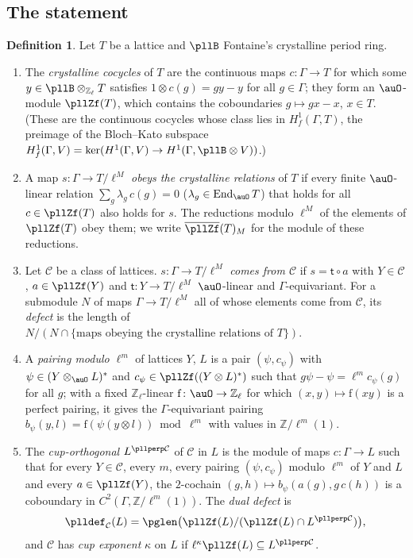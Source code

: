 \documentclass[10pt]{amsart}
\theoremstyle{definition}
\newtheorem{definition}[theorem]{Definition}
\theoremstyle{remark}
\newcommand{\Z}{\mathbb Z}
\begin{document}
\subsection{The statement}\label{pll:ss-statement}

\begin{definition}\label{pll:def}
Let $T$ be a lattice and $\pllB$ Fontaine's crystalline period ring.
\begin{enumerate}
\item The \emph{crystalline cocycles} of $T$ are the continuous maps $c\colon\Gamma\to T$ for which some
$y\in\pllB\otimes_{\Z_\ell}T$ satisfies $1\otimes c(g)=gy-y$ for all $g\in\Gamma$; they form an
$\auO$-module $\pllZf(T)$, which contains the coboundaries $g\mapsto gx-x$, $x\in T$. (These are
the continuous cocycles whose class lies in $H^1_f(\Gamma,T)$, the preimage of the Bloch--Kato
subspace $H^1_f(\Gamma,V)=\ker(H^1(\Gamma,V)\to H^1(\Gamma,\pllB\otimes V))$.)
\item A map $s\colon\Gamma\to T/\ell^M$ \emph{obeys the crystalline relations} of $T$ if every
finite $\auO$-linear relation $\sum_g\lambda_g\,c(g)=0$ ($\lambda_g\in\operatorname{End}_\auO T$)
that holds for all $c\in\pllZf(T)$ also holds for $s$. The reductions modulo $\ell^M$ of the
elements of $\pllZf(T)$ obey them; we write $\overline{\pllZf}(T)_M$ for the module of these
reductions.
\item Let $\mathcal C$ be a class of lattices. $s\colon\Gamma\to T/\ell^M$ \emph{comes from
$\mathcal C$} if $s=\mathsf t\circ a$ with $Y\in\mathcal C$, $a\in\pllZf(Y)$ and $\mathsf t\colon
Y\to T/\ell^M$ $\auO$-linear and $\Gamma$-equivariant. For a submodule $N$ of maps
$\Gamma\to T/\ell^M$ all of whose elements come from $\mathcal C$, its \emph{defect} is the length
of $N/(N\cap\{\text{maps obeying the crystalline relations of }T\})$.
\item A \emph{pairing modulo $\ell^m$} of lattices $Y$, $L$ is a pair $(\psi,c_\psi)$ with
$\psi\in(Y\otimes_\auO L)^*$ and $c_\psi\in\pllZf((Y\otimes L)^*)$ such that $g\psi-\psi=
\ell^mc_\psi(g)$ for all $g$; with a fixed $\Z_\ell$-linear $\mathrm{f}\colon\auO\to\Z_\ell$ for
which $(x,y)\mapsto\mathrm f(xy)$ is a perfect pairing, it gives the $\Gamma$-equivariant pairing
$b_\psi(y,l)=\mathrm f(\psi(y\otimes l))\bmod\ell^m$ with values in $\Z/\ell^m(1)$.
\item The \emph{cup-orthogonal} $L^{\pllperp\mathcal C}$ of $\mathcal C$ in $L$ is the module of
maps $c\colon\Gamma\to L$ such that for every $Y\in\mathcal C$, every $m$, every pairing
$(\psi,c_\psi)$ modulo $\ell^m$ of $Y$ and $L$ and every $a\in\pllZf(Y)$, the $2$-cochain
$(g,h)\mapsto b_\psi(a(g),g\,c(h))$ is a coboundary in $C^2(\Gamma,\Z/\ell^m(1))$. The \emph{dual
defect} is
\[
\plldef_{\mathcal C}(L)=\pglen\bigl(\pllZf(L)/(\pllZf(L)\cap L^{\pllperp\mathcal C})\bigr),
\]
and $\mathcal C$ has \emph{cup exponent} $\kappa$ on $L$ if $\ell^\kappa\pllZf(L)\subseteq L^{\pllperp
\mathcal C}$.
\end{enumerate}
\end{definition}
\end{document}
